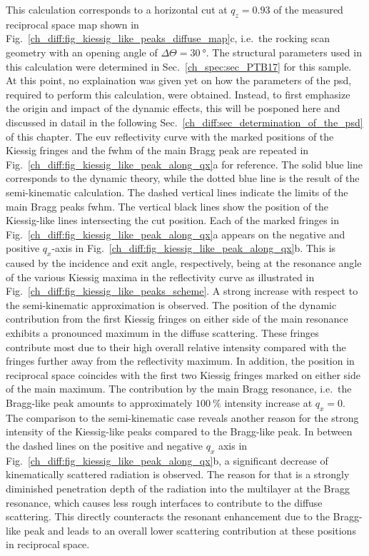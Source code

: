 This calculation corresponds to a horizontal cut at $q_z=0.93$ of the measured reciprocal space map shown in Fig.~\ref{ch_diff:fig_kiessig_like_peaks_diffuse_map}c, i.e.~the rocking scan geometry with an opening angle of $\Delta \Theta = \SI{30}{\degree}$. The structural parameters used in this calculation were determined in Sec.~\ref{ch_spec:sec_PTB17} for this sample. At this point, no explaination was given yet on how the parameters of the \gls{psd}, required to perform this calculation, were obtained. Instead, to first emphasize the origin and impact of the dynamic effects, this will be posponed here and discussed in datail in the following Sec.~\ref{ch_diff:sec_determination_of_the_psd} of this chapter. The \gls{euv} reflectivity curve with the marked positions of the Kiessig fringes and the \gls{fwhm} of the main Bragg peak are repeated in Fig.~\ref{ch_diff:fig_kiessig_like_peak_along_qx}a for reference.
The solid blue line corresponds to the dynamic theory, while the dotted blue line is the result of the semi-kinematic calculation. The dashed vertical lines indicate the limits of the main Bragg peaks \gls{fwhm}. The vertical black lines show the position of the Kiessig-like lines intersecting the cut position. Each of the marked fringes in Fig.~\ref{ch_diff:fig_kiessig_like_peak_along_qx}a appears on the negative and positive $q_x$-axis in Fig.~\ref{ch_diff:fig_kiessig_like_peak_along_qx}b. This is caused by the incidence and exit angle, respectively, being at the resonance angle of the various Kiessig maxima in the reflectivity curve as illustrated in Fig.~\ref{ch_diff:fig_kiessig_like_peaks_scheme}. A strong increase with respect to the semi-kinematic approximation is observed. The position of the dynamic contribution from the first 
Kiessig fringes on either side of the main resonance exhibits a pronounced maximum in the diffuse scattering. These fringes contribute most due to their high overall relative 
intensity compared with the fringes further away from the reflectivity maximum. In addition, the position in reciprocal space coincides with the first two Kiessig fringes marked on either side of the main maximum. The contribution by the main Bragg resonance, i.e.~the Bragg-like peak amounts to approximately $\SI{100}{\percent}$ intensity increase at $q_x=0$. The comparison to the semi-kinematic case reveals another reason for the strong intensity of the Kiessig-like peaks compared to the Bragg-like peak. In between the dashed lines on the positive and negative $q_x$ axis in Fig.~\ref{ch_diff:fig_kiessig_like_peak_along_qx}b, a significant decrease of kinematically scattered radiation is observed. The reason for that is a strongly diminished penetration depth of the radiation into the multilayer at the Bragg resonance, which causes less rough interfaces to contribute to the diffuse scattering. This directly counteracts the resonant enhancement due to the Bragg-like peak and leads to an overall lower scattering contribution at these positions in reciprocal space.

